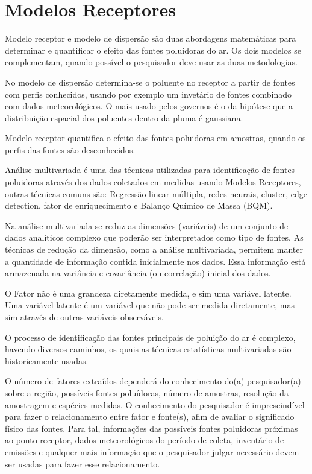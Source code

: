 \section{Modelos Receptores}

Modelo receptor e modelo de dispersão são duas abordagens matemáticas 
para determinar e quantificar o efeito das fontes poluidoras do ar. 
Os dois modelos se complementam, quando possível o pesquisador deve
usar as duas metodologias. 

No modelo de dispersão determina-se o poluente no receptor a 
partir de fontes com perfis conhecidos, usando por exemplo um invetário de 
fontes combinado com dados meteorológicos. O mais usado pelos governos é o da 
hipótese que a distribuição espacial dos poluentes dentro da pluma é gaussiana. 

Modelo receptor quantifica o efeito das fontes poluidoras em amostras, 
quando os perfis das fontes são desconhecidos.

Análise multivariada é uma das técnicas utilizadas para identificação
de fontes poluidoras através dos dados coletados em medidas usando
Modelos Receptores, outras técnicas comuns são: Regressão linear múltipla,
redes neurais, cluster, edge detection, fator de enriquecimento e 
Balanço Químico de Massa (BQM).  

Na análise multivariada se reduz as dimensões (variáveis) de um 
conjunto de dados analíticos complexo que poderão ser interpretados 
como tipo de fontes.
As técnicas de redução da dimensão, como a análise multivariada, 
permitem manter a quantidade de informação contida inicialmente nos dados. 
Essa informação está armazenada na variância e covariância (ou correlação) 
inicial dos dados. 

O Fator não é uma grandeza diretamente medida, e sim uma variável latente.
Uma variável latente é um variável que não pode ser medida diretamente, 
mas sim através de outras variáveis observáveis. 

O processo de identificação das fontes principais de poluição do ar é 
complexo, havendo diversos caminhos, os quais as técnicas estatísticas
multivariadas são historicamente usadas.

O número de fatores extraídos dependerá do conhecimento do(a) pesquisador(a)
sobre a região, possíveis fontes poluídoras, número de amostras, 
resolução da amostragem e espécies medidas.
O conhecimento do pesquisador é imprescindível para fazer o relacionamento 
entre fator e fonte(s), afim de avaliar o significado físico das fontes. 
Para tal, informações das possíveis fontes poluidoras próximas ao ponto 
receptor, dados meteorológicos do período de coleta, inventário de emissões 
e qualquer mais informação que o pesquisador julgar necessário devem ser 
usadas para fazer esse relacionamento.

